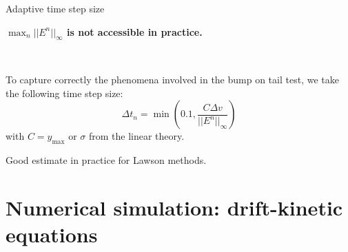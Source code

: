 \documentclass{beamer}
\newcommand{\arrow}{{{\color{mblue}\ding{220}}}}
\newcommand{\mbold}[1]{\textbf{\color{mblue}#1}}
\begin{document}
\begin{frame}{Adaptive time step size}
  \centerline{\mbold{$\max_n||E^n||_\infty$ is not accessible in practice.}}

  \ 

  To capture correctly the phenomena involved in the bump on tail test, we take the following time step size:
  $$
    \Delta t_n = \min\left(0.1,\frac{C\Delta v}{||E^n||_\infty}\right)
  $$
  with $C=y_\text{max}$ or $\sigma$ from the linear theory.

  \arrow Good estimate in practice for Lawson methods.
\end{frame}



\section{Numerical simulation: drift-kinetic equations}
\end{document}

